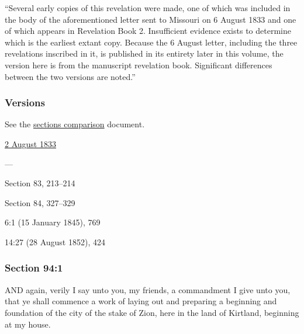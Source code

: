 			``Several early copies of this revelation were made, one of which was included in the body of the aforementioned letter sent to Missouri on 6 August 1833 and one of which appears in Revelation Book 2. Insufficient evidence exists to determine which is the earliest extant copy. Because the 6 August letter, including the three revelations inscribed in it, is published in its entirety later in this volume, the version here is from the manuscript revelation book. Significant differences between the two versions are noted.''
			
	\subsubsection{Versions}
		\label{DC94-V}
		
		See the \href{https://drive.google.com/file/d/1goAvNz8jS4R8slYfMG_db55Ty2z_vmgK/view?usp=sharing}{sections comparison} document.
	
		\begin{compactdesc}
			\item[JSP] \hyperref[EMS-1833-JS-2-AUG-1833-B]{2 August 1833}
			\item[BC] ---
			\item[DC 1835] Section 83, 213--214
			\item[DC 1844] Section 84, 327--329
			\item[TS] 6:1 (15 January 1845), 769
			\item[MS] 14:27 (28 August 1852), 424
		\end{compactdesc}

	\subsubsection{Section 94:1} %
		\label{DC94-1}

		AND again, verily I say unto you, my friends, a commandment I give unto you, that ye shall commence a work of laying out and preparing a beginning and foundation of the city of the stake of Zion, here in the land of Kirtland, beginning at my house.


